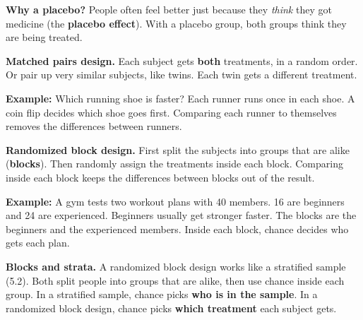 \documentclass[11pt]{article}
\begin{document}
\vspace{0.6em}
\textbf{Why a placebo?} People often feel better just because they \textit{think} they got medicine (the \textbf{placebo effect}).
With a placebo group, both groups think they are being treated.

\newpage
\textbf{Matched pairs design.} Each subject gets \textbf{both} treatments, in a random order. Or pair up very similar subjects, like twins. Each twin gets a different treatment.

\vspace{0.2em}
\textbf{Example:} Which running shoe is faster? Each runner runs once in each shoe. A coin flip decides which shoe goes first.
Comparing each runner to themselves removes the differences between runners.

\vspace{0.6em}
\textbf{Randomized block design.} First split the subjects into groups that are alike (\textbf{blocks}). Then randomly assign the treatments inside each block. Comparing inside each block keeps the differences between blocks out of the result.

\vspace{0.2em}
\textbf{Example:} A gym tests two workout plans with 40 members. 16 are beginners and 24 are experienced. Beginners usually get stronger faster.
The blocks are the beginners and the experienced members. Inside each block, chance decides who gets each plan.

\begin{center}\end{center}

\textbf{Blocks and strata.} A randomized block design works like a stratified sample (5.2). Both split people into groups that are alike, then use chance inside each group.
In a stratified sample, chance picks \textbf{who is in the sample}. In a randomized block design, chance picks \textbf{which treatment} each subject gets.

\partner
\end{document}
